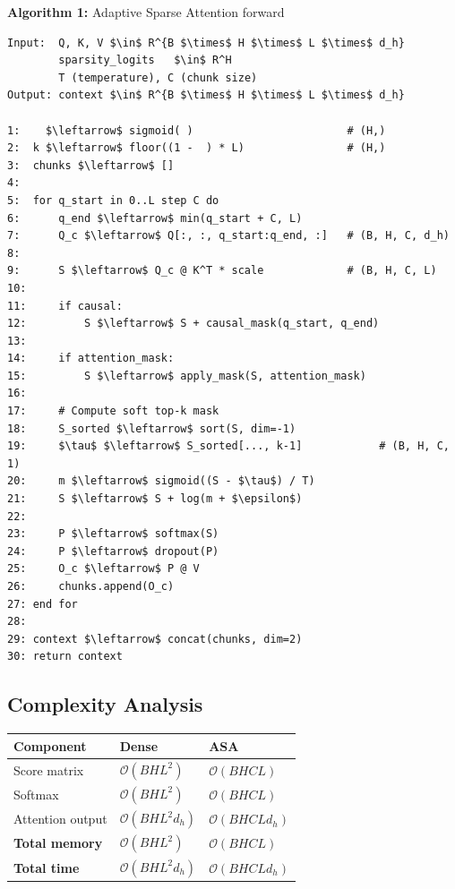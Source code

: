 \textbf{Algorithm 1:} Adaptive Sparse Attention forward
\begin{lstlisting}
Input:  Q, K, V $\in$ R^{B $\times$ H $\times$ L $\times$ d_h}
        sparsity_logits   $\in$ R^H
        T (temperature), C (chunk size)
Output: context $\in$ R^{B $\times$ H $\times$ L $\times$ d_h}

1:    $\leftarrow$ sigmoid( )                        # (H,)
2:  k $\leftarrow$ floor((1 -  ) * L)                # (H,)
3:  chunks $\leftarrow$ []
4:
5:  for q_start in 0..L step C do
6:      q_end $\leftarrow$ min(q_start + C, L)
7:      Q_c $\leftarrow$ Q[:, :, q_start:q_end, :]   # (B, H, C, d_h)
8:
9:      S $\leftarrow$ Q_c @ K^T * scale             # (B, H, C, L)
10:
11:     if causal:
12:         S $\leftarrow$ S + causal_mask(q_start, q_end)
13:
14:     if attention_mask:
15:         S $\leftarrow$ apply_mask(S, attention_mask)
16:
17:     # Compute soft top-k mask
18:     S_sorted $\leftarrow$ sort(S, dim=-1)
19:     $\tau$ $\leftarrow$ S_sorted[..., k-1]            # (B, H, C, 1)
20:     m $\leftarrow$ sigmoid((S - $\tau$) / T)
21:     S $\leftarrow$ S + log(m + $\epsilon$)
22:
23:     P $\leftarrow$ softmax(S)
24:     P $\leftarrow$ dropout(P)
25:     O_c $\leftarrow$ P @ V
26:     chunks.append(O_c)
27: end for
28:
29: context $\leftarrow$ concat(chunks, dim=2)
30: return context
\end{lstlisting}

\subsection{Complexity Analysis}

\begin{table}[H]
\centering
\small
\begin{tabular}{lll}
\toprule
\textbf{Component} & \textbf{Dense} & \textbf{ASA} \\
\midrule
Score matrix & $\mathcal{O}(B H L^2)$ & $\mathcal{O}(B H C L)$ \\
Softmax & $\mathcal{O}(B H L^2)$ & $\mathcal{O}(B H C L)$ \\
Attention output & $\mathcal{O}(B H L^2 d_h)$ & $\mathcal{O}(B H C L d_h)$ \\
\textbf{Total memory} & $\mathcal{O}(B H L^2)$ & $\mathcal{O}(B H C L)$ \\
\textbf{Total time} & $\mathcal{O}(B H L^2 d_h)$ & $\mathcal{O}(B H C L d_h)$ \\
\bottomrule
\end{tabular}
\end{table}

